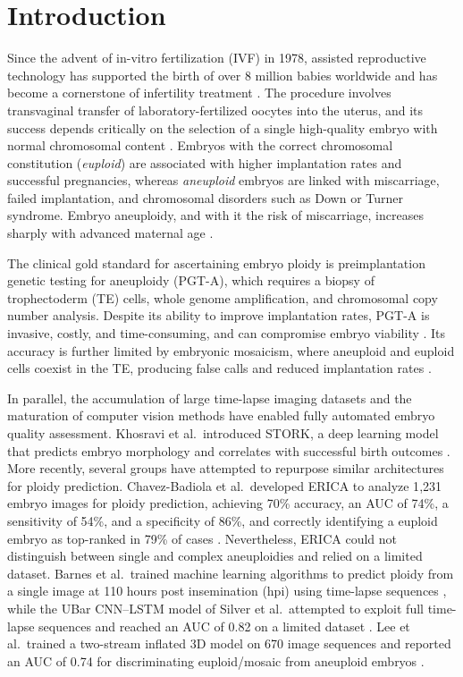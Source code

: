 \documentclass[11pt,a4paper]{article}
\begin{document}
\section{Introduction}\label{sec:intro}

Since the advent of in-vitro fertilization (IVF) in 1978, assisted
reproductive technology has supported the birth of over 8 million babies
worldwide and has become a cornerstone of infertility treatment
\cite{dyer2016international}. The procedure involves transvaginal transfer
of laboratory-fertilized oocytes into the uterus, and its success depends
critically on the selection of a single high-quality embryo with normal
chromosomal content \cite{practice2017performing,munne2019preimplantation}.
Embryos with the correct chromosomal constitution (\emph{euploid}) are
associated with higher implantation rates and successful pregnancies,
whereas \emph{aneuploid} embryos are linked with miscarriage, failed
implantation, and chromosomal disorders such as Down or Turner syndrome.
Embryo aneuploidy, and with it the risk of miscarriage, increases sharply
with advanced maternal age \cite{franasiak2014nature}.

The clinical gold standard for ascertaining embryo ploidy is
preimplantation genetic testing for aneuploidy (PGT-A), which requires a
biopsy of trophectoderm (TE) cells, whole genome amplification, and
chromosomal copy number analysis. Despite its ability to improve
implantation rates, PGT-A is invasive, costly, and time-consuming, and can
compromise embryo viability \cite{munne2019preimplantation}. Its accuracy
is further limited by embryonic mosaicism, where aneuploid and euploid
cells coexist in the TE, producing false calls and reduced implantation
rates \cite{popovic2020mosaic}.

In parallel, the accumulation of large time-lapse imaging datasets and the
maturation of computer vision methods have enabled fully automated embryo
quality assessment. Khosravi et al.\ introduced STORK, a deep learning
model that predicts embryo morphology and correlates with successful birth
outcomes \cite{khosravi2019deep}. More recently, several groups have
attempted to repurpose similar architectures for ploidy prediction.
Chavez-Badiola et al.\ developed ERICA to analyze 1{,}231 embryo images
for ploidy prediction, achieving 70\% accuracy, an AUC of 74\%, a
sensitivity of 54\%, and a specificity of 86\%, and correctly identifying
a euploid embryo as top-ranked in 79\% of cases
\cite{chavezbadiola2020predicting}. Nevertheless, ERICA could not
distinguish between single and complex aneuploidies and relied on a
limited dataset. Barnes et al.\ trained machine learning algorithms to
predict ploidy from a single image at 110 hours post insemination (hpi)
using time-lapse sequences \cite{barnes2023noninvasive}, while the UBar
CNN--LSTM model of Silver et al.\ attempted to exploit full time-lapse
sequences and reached an AUC of 0.82 on a limited dataset
\cite{silver2020data}. Lee et al.\ trained a two-stream inflated 3D model
on 670 image sequences and reported an AUC of 0.74 for discriminating
euploid/mosaic from aneuploid embryos \cite{lee2022end}.
\end{document}
